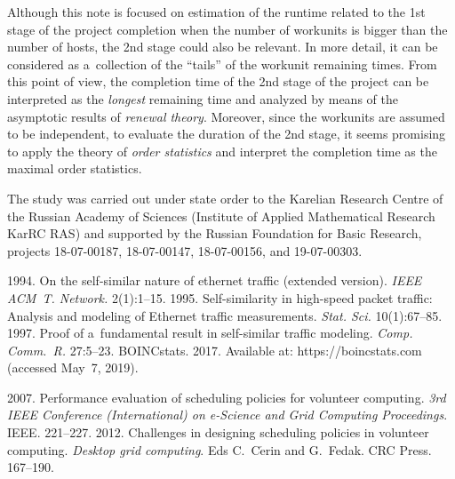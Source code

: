 \begin{multicols}{2}
Although  this note is focused on estimation of the runtime related to the 
1st stage of the project completion when the number of workunits is bigger 
than the number of hosts,  the 2nd  stage 
could also be relevant.
In more detail, it can be considered as a~collection of the ``tails''  
of the  workunit remaining times. From this point of view, the completion time of the 
2nd stage of the project  can be interpreted as  the \textit{longest} remaining time 
and analyzed by means of the asymptotic results of \textit{renewal theory}.
 Moreover, since the workunits are assumed to be independent, to evaluate the  
 duration of the  2nd stage, it seems promising to  apply the theory of 
 \textit{order statistics} and interpret the completion  time as the maximal 
 order statistics. 


\Ack
\noindent
The study was carried out under state order to the Karelian Research 
Centre of the Russian Academy of Sciences (Institute of Applied Mathematical 
Research KarRC RAS) and supported by the Russian Foundation for Basic Research, 
projects 18-07-00187, 18-07-00147, 18-07-00156, and 19-07-00303.


\renewcommand{\bibname}{\protect\rmfamily References}



{\small\frenchspacing
{ %
\begin{thebibliography}{99}


 1994. On the self-similar nature of ethernet traffic (extended version). 
 \textit{IEEE ACM~T. Network.} 2(1):1--15.
1995. Self-similarity in high-speed packet traffic: Analysis and modeling of Ethernet 
traffic measurements. \textit{Stat. Sci.} 10(1):67--85.
 1997. 
Proof of a~fundamental result in self-similar traffic modeling. 
\textit{Comp. Comm.~R.} 27:5--23.
BOINCstats. 2017. Available at: {\sf https://boincstats.com} (accessed May~7, 2019).

2007. Performance evaluation of scheduling policies for volunteer computing.  
\textit{3rd IEEE Conference (International) on e-Science and Grid Computing 
Proceedings}. IEEE. 221--227.
 2012. Challenges in 
designing scheduling policies in volunteer computing. 
\textit{Desktop grid computing}. Eds C.~C$\acute{\mbox{e}}$rin and G.~Fedak. 
CRC Press. 167--190.


\end{thebibliography}}}
\end{multicols}
